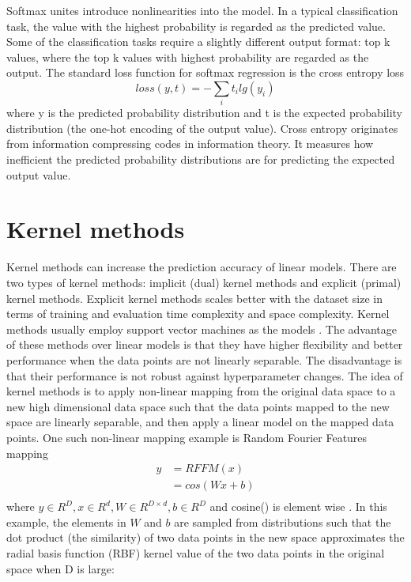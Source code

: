 \documentclass[12pt]{WSUThesis}
\theoremstyle{definition}
\begin{document}
Softmax unites introduce nonlinearities into the model.
In a typical classification task, the value with the highest probability is regarded as the predicted value.
Some of the classification tasks require a slightly different output format: top k values, where the top k values with highest probability are regarded as the output.
The standard loss function for softmax regression is the cross entropy loss
\[loss(y, t) = - \sum_i t_i lg(y_i)\]
where y is the predicted probability distribution and t is the expected probability distribution (the one-hot encoding of the output value).
Cross entropy originates from information compressing codes in information theory.
It measures how inefficient the predicted probability distributions are for predicting the expected output value.

\section{Kernel methods}
Kernel methods can increase the prediction accuracy of linear models.
There are two types of kernel methods: implicit (dual) kernel methods and explicit (primal) kernel methods.
Explicit kernel methods scales better with the dataset size in terms of training and evaluation time complexity and space complexity.
Kernel methods usually employ support vector machines as the models \cite{hofmann2008kernel}.
The advantage of these methods over linear models is that they have higher flexibility and better performance when the data points are not linearly separable.
The disadvantage is that their performance is not robust against hyperparameter changes.
The idea of kernel methods is to apply non-linear mapping from the original data space to a new high dimensional data space such that the data points mapped to the new space are linearly separable, and then apply a linear model on the mapped data points.
One such non-linear mapping example is Random Fourier Features mapping
\begin{align*}
	y 
	&= RFFM(x) \\
	&= cos(Wx + b) \\
\end{align*}
where $ y \in R^D, x \in R^d, W \in R^{D \times d}, b \in R^D $ and cosine() is element wise \cite{rahimi2008random}.
In this example, the elements in $ W $ and $ b $ are sampled from distributions such that the dot product (the similarity) of two data points in the new space approximates the radial basis function (RBF) kernel value of the two data points in the original space when D is large:
\end{document}
